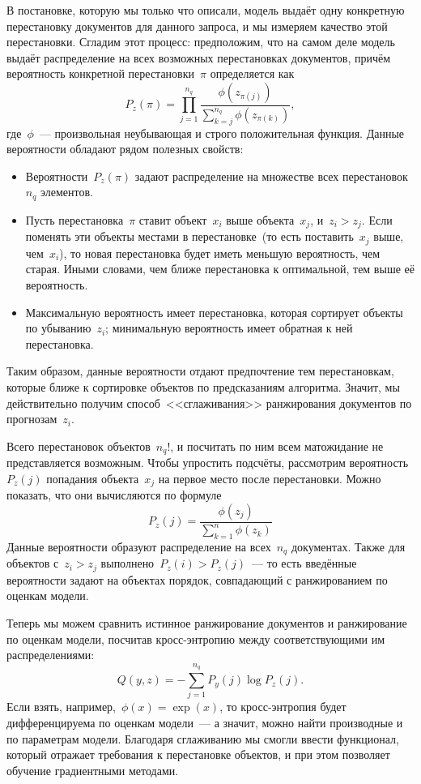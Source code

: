 \documentclass[12pt,fleqn]{article}
\begin{document}
В постановке, которую мы только что описали, модель выдаёт одну конкретную перестановку документов для данного
запроса, и мы измеряем качество этой перестановки.
Сгладим этот процесс: предположим, что на самом деле модель выдаёт распределение на всех возможных перестановках
документов, причём вероятность конкретной перестановки~$\pi$ определяется как
\[
    P_z(\pi)
    =
    \prod_{j = 1}^{n_q}
        \frac{
            \phi(z_{\pi(j)})
        }{
            \sum_{k = j}^{n_q}
                \phi(z_{\pi(k)})
        },
\]
где~$\phi$~--- произвольная неубывающая и строго положительная функция.
Данные вероятности обладают рядом полезных свойств:
\begin{itemize}
    \item Вероятности~$P_z(\pi)$ задают распределение на множестве всех перестановок~$n_q$ элементов.
    \item Пусть перестановка~$\pi$ ставит объект~$x_i$ выше объекта~$x_j$,
        и~$z_i > z_j$.
        Если поменять эти объекты местами в перестановке~(то есть поставить~$x_j$ выше, чем~$x_i$),
        то новая перестановка будет иметь меньшую вероятность, чем старая.
        Иными словами, чем ближе перестановка к оптимальной, тем выше её вероятность.
    \item Максимальную вероятность имеет перестановка, которая сортирует объекты по убыванию~$z_i$;
        минимальную вероятность имеет обратная к ней перестановка.
\end{itemize}

Таким образом, данные вероятности отдают предпочтение тем перестановкам, которые ближе
к сортировке объектов по предсказаниям алгоритма.
Значит, мы действительно получим способ~<<сглаживания>> ранжирования документов по прогнозам~$z_i$.

Всего перестановок объектов~$n_q!$, и посчитать по ним всем матожидание не представляется возможным.
Чтобы упростить подсчёты, рассмотрим вероятность~$P_z(j)$ попадания объекта~$x_j$ на первое место
после перестановки.
Можно показать, что они вычисляются по формуле
\[
    P_z(j)
    =
    \frac{
        \phi(z_j)
    }{
        \sum_{k = 1}^{n}
            \phi(z_k)
    }
\]
Данные вероятности образуют распределение на всех~$n_q$ документах.
Также для объектов с~$z_i > z_j$ выполнено~$P_z(i) > P_z(j)$~---
то есть введённые вероятности задают на объектах порядок, совпадающий
с ранжированием по оценкам модели.

Теперь мы можем сравнить истинное ранжирование документов и ранжирование по оценкам модели,
посчитав кросс-энтропию между соответствующими им распределениями:
\[
    Q(y, z)
    =
    -
    \sum_{j = 1}^{n_q}
        P_y(j)
        \log P_z(j).
\]
Если взять, например,~$\phi(x) = \exp(x)$,
то кросс-энтропия будет дифференцируема по оценкам модели~---
а значит, можно найти производные и по параметрам модели.
Благодаря сглаживанию мы смогли ввести функционал, который отражает
требования к перестановке объектов,
и при этом позволяет обучение градиентными методами.



\end{document}
